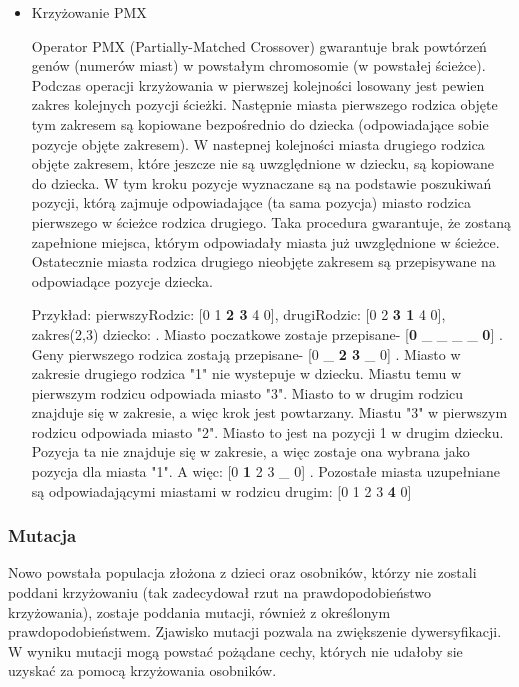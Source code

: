 \documentclass[a4paper,11pt]{article}
\begin{document}
\begin{itemize}
\item Krzyżowanie PMX

Operator PMX (Partially-Matched Crossover) gwarantuje brak powtórzeń genów (numerów miast) w powstałym chromosomie (w powstałej ścieżce). Podczas operacji krzyżowania w pierwszej kolejności losowany jest pewien zakres kolejnych pozycji ścieżki. Następnie miasta pierwszego rodzica objęte tym zakresem są kopiowane bezpośrednio do dziecka (odpowiadające sobie pozycje objęte zakresem). W nastepnej kolejności miasta drugiego rodzica objęte zakresem, które jeszcze nie są uwzględnione w dziecku, są kopiowane do dziecka. W tym kroku pozycje wyznaczane są na podstawie poszukiwań pozycji, którą zajmuje odpowiadające (ta sama pozycja) miasto rodzica pierwszego w ścieżce rodzica drugiego. Taka procedura gwarantuje, że zostaną zapełnione miejsca, którym odpowiadały miasta już uwzględnione w ścieżce. Ostatecznie miasta rodzica drugiego nieobjęte zakresem są przepisywane na odpowiadące pozycje dziecka.

Przykład:
pierwszyRodzic: [0 1 \textbf{2 3} 4 0], drugiRodzic: [0 2 \textbf{3 1} 4 0], zakres(2,3)
\newline dziecko:
. Miasto poczatkowe zostaje przepisane-  [\textbf{0} _ _ _ _ \textbf{0}]
. Geny pierwszego rodzica zostają przepisane-  [0 _  \textbf{2 3} _ 0]
. Miasto w zakresie drugiego rodzica "1" nie wystepuje w dziecku. Miastu temu w pierwszym rodzicu odpowiada miasto "3". Miasto to w drugim rodzicu znajduje się w zakresie, a więc krok jest powtarzany. Miastu "3" w pierwszym rodzicu odpowiada miasto "2". Miasto to jest na pozycji 1 w drugim dziecku. Pozycja ta nie znajduje się w zakresie, a więc zostaje ona wybrana jako pozycja dla miasta "1". 
\newline A więc: [0 \textbf{1}  2 3 _ 0]
. Pozostałe miasta uzupełniane są odpowiadającymi miastami w rodzicu drugim:  [0 1 2 3  \textbf{4} 0]

\end{itemize}


\subsubsection{Mutacja}

Nowo powstała populacja złożona z dzieci oraz osobników, którzy nie zostali poddani krzyżowaniu (tak zadecydował rzut na prawdopodobieństwo krzyżowania), zostaje poddania mutacji, również z określonym prawdopodobieństwem. Zjawisko mutacji pozwala na zwiększenie dywersyfikacji. W wyniku mutacji mogą powstać pożądane cechy, których nie udałoby sie uzyskać za pomocą krzyżowania osobników.
\end{document}
